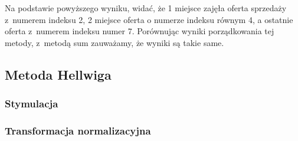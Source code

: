 \documentclass[12pt,a4paper]{report}
\begin{document}
{Na podstawie powyższego wyniku, widać, że 1 miejsce zajęła oferta
sprzedaży z~numerem indeksu 2, 2 miejsce oferta o numerze indeksu równym 4, a ostatnie oferta z~numerem indeksu numer 7. Porównując wyniki porządkowania tej metody, z~metodą sum zauważamy, że wyniki są takie same. 

\subsection{Metoda Hellwiga}
\subsubsection{Stymulacja} 
\begin{Shaded}
\begin{Highlighting}[]
\NormalTok{)} 
\end{Highlighting}
\end{Shaded}
\subsubsection{Transformacja normalizacyjna}
\begin{Shaded}
\begin{Highlighting}[]
\end{Highlighting}
\end{Shaded}
}
\end{document}
